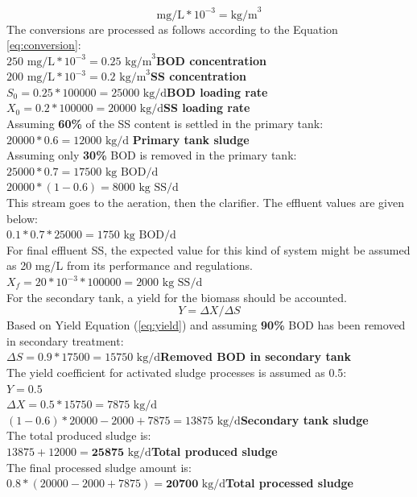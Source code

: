 \documentclass[a4paper]{article}
\begin{document}
\begin{equation}
\label{eq:conversion}
    \text{mg/L} * 10^{-3} = \text{kg/m}^3
\end{equation}
The conversions are processed as follows according to the Equation \ref{eq:conversion}:\\
$250 \text{ mg/L}*10^{-3}=0.25 \text{ kg/m}^3$\hfill \textbf{BOD concentration}\\
$200 \text{ mg/L}*10^{-3}=0.2 \text{ kg/m}^3$\hfill \textbf{SS concentration}\\
$S_0=0.25*100000=25000\text{ kg/d}$\hfill \textbf{BOD loading rate}\\
$X_0=0.2*100000=20000 \text{ kg/d}$\hfill \textbf{SS loading rate}\\
Assuming \textbf{60\%} of the SS content is settled in the primary tank:\\
$20000*0.6=12000 \text{ kg/d}$ \hfill \textbf{Primary tank sludge}\\
Assuming only \textbf{30\%} BOD is removed in the primary tank:\\
$25000*0.7=17500\text{ kg BOD/d}$\\
$20000*(1-0.6)=8000\text{ kg SS/d}$\\
This stream goes to the aeration, then the clarifier. The effluent values are given below:\\
$0.1*0.7*25000=1750 \text{ kg BOD/d}$\\
For final effluent SS, the expected value for this kind of system might be assumed as 20 mg/L from its performance and regulations.\\
$X_f = 20*10^{-3}*100000=2000\text{ kg SS/d}$\\
For the secondary tank, a yield for the biomass should be accounted.
\begin{equation}
    Y = {\Delta}X / {\Delta}S \label{eq:yield}
\end{equation}
Based on Yield Equation (\ref{eq:yield}) and assuming \textbf{90\%} BOD has been removed in secondary treatment:\\
$\Delta S = 0.9*17500 = 15750\text{ kg/d}$\hfill \textbf{Removed BOD in secondary tank}\\
The yield coefficient for activated sludge processes is assumed as 0.5:\\
$Y = 0.5$\\
$\Delta X = 0.5 * 15750 = 7875\text{ kg/d}$\\
$(1-0.6)*20000-2000+7875=13875\text{ kg/d}$\hfill\textbf{Secondary tank sludge}\\
The total produced sludge is:\\
$13875+12000=\textbf{25875}\text{ kg/d}$\hfill\textbf{Total produced sludge}\\
The final processed sludge amount is:\\
$0.8*(20000-2000+7875) = \textbf{20700}\text{ kg/d}$\hfill\textbf{Total processed sludge}
\end{document}
